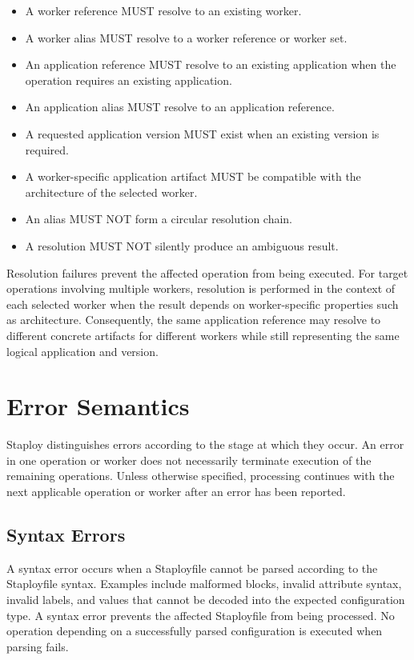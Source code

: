 \documentclass[11pt,a4paper]{article}
\begin{document}
    \begin{itemize}
        \item A worker reference MUST resolve to an existing worker.
        \item A worker alias MUST resolve to a worker reference or worker set.
        \item An application reference MUST resolve to an existing application when the operation requires an existing application.
        \item An application alias MUST resolve to an application reference.
        \item A requested application version MUST exist when an existing version is required.
        \item A worker-specific application artifact MUST be compatible with the architecture of the selected worker.
        \item An alias MUST NOT form a circular resolution chain.
        \item A resolution MUST NOT silently produce an ambiguous result.
    \end{itemize}

    Resolution failures prevent the affected operation from being executed.
    For target operations involving multiple workers, resolution is performed in the context of each selected worker when the result depends on worker-specific properties such as architecture.
    Consequently, the same application reference may resolve to different concrete artifacts for different workers while still representing the same logical application and version.


    \section{Error Semantics}\label{sec:error-semantics}

    Staploy distinguishes errors according to the stage at which they occur.
    An error in one operation or worker does not necessarily terminate execution of the remaining operations.
    Unless otherwise specified, processing continues with the next applicable operation or worker after an error has been reported.

    \subsection{Syntax Errors}\label{subsec:syntax-errors}

    A syntax error occurs when a Staployfile cannot be parsed according to the Staployfile syntax.
    Examples include malformed blocks, invalid attribute syntax, invalid labels, and values that cannot be decoded into the expected configuration type.
    A syntax error prevents the affected Staployfile from being processed.
    No operation depending on a successfully parsed configuration is executed when parsing fails.
\end{document}
